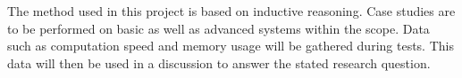 The method used in this project is based on inductive reasoning. Case studies are to be performed on basic as well as advanced systems within the scope. Data such as computation speed and memory usage will be gathered during tests. This data will then be used in a discussion to answer the stated research question.
